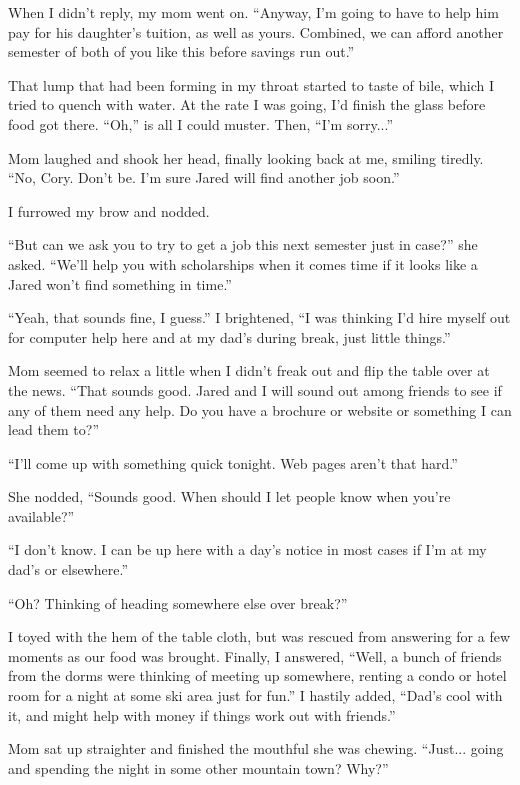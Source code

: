 When I didn't reply, my mom went on.  ``Anyway, I'm going to have to help him pay for his daughter's tuition, as well as yours.  Combined, we can afford another semester of both of you like this before savings run out.''

That lump that had been forming in my throat started to taste of bile, which I tried to quench with water.  At the rate I was going, I'd finish the glass before food got there.  ``Oh,'' is all I could muster.  Then, ``I'm sorry...''

Mom laughed and shook her head, finally looking back at me, smiling tiredly.  ``No, Cory.  Don't be.  I'm sure Jared will find another job soon.''

I furrowed my brow and nodded.

``But can we ask you to try to get a job this next semester just in case?'' she asked.  ``We'll help you with scholarships when it comes time if it looks like a Jared won't find something in time.''

``Yeah, that sounds fine, I guess.''  I brightened, ``I was thinking I'd hire myself out for computer help here and at my dad's during break, just little things.''

Mom seemed to relax a little when I didn't freak out and flip the table over at the news.  ``That sounds good.  Jared and I will sound out among friends to see if any of them need any help.  Do you have a brochure or website or something I can lead them to?''

``I'll come up with something quick tonight.  Web pages aren't that hard.''

She nodded, ``Sounds good.  When should I let people know when you're available?''

``I don't know.  I can be up here with a day's notice in most cases if I'm at my dad's or elsewhere.''

``Oh?  Thinking of heading somewhere else over break?''

I toyed with the hem of the table cloth, but was rescued from answering for a few moments as our food was brought.  Finally, I answered, ``Well, a bunch of friends from the dorms were thinking of meeting up somewhere, renting a condo or hotel room for a night at some ski area just for fun.''  I hastily added, ``Dad's cool with it, and might help with money if things work out with friends.''

Mom sat up straighter and finished the mouthful she was chewing.  ``Just... going and spending the night in some other mountain town?  Why?''

